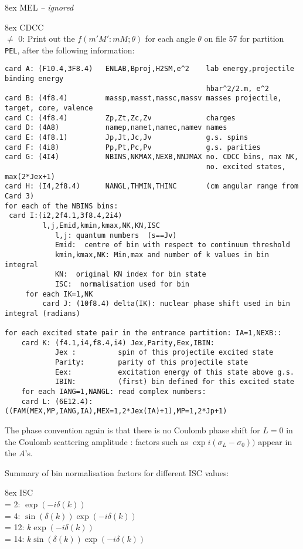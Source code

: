 \documentclass[11pt]{article}
\begin{document}
\hangindent 8ex  MEL   {\em -- ignored}

\hangindent 8ex  CDCC
\\  $\neq$ 0:
Print out the $f(m'M':mM; \theta)$ for each angle $\theta$
on file 57 for partition {\tt PEL}, after the following information:
{\small
\begin{verbatim}
card A: (F10.4,3F8.4)   ENLAB,Bproj,H2SM,e^2    lab energy,projectile binding energy
                                                hbar^2/2.m, e^2
card B: (4f8.4)         massp,masst,massc,massv masses projectile, target, core, valence
card C: (4f8.4)         Zp,Zt,Zc,Zv             charges
card D: (4A8)           namep,namet,namec,namev names
card E: (4f8.1)         Jp,Jt,Jc,Jv             g.s. spins
card F: (4i8)           Pp,Pt,Pc,Pv             g.s. parities
card G: (4I4)           NBINS,NKMAX,NEXB,NNJMAX no. CDCC bins, max NK,
                                                no. excited states, max(2*Jex+1)
card H: (I4,2f8.4)      NANGL,THMIN,THINC       (cm angular range from Card 3)
for each of the NBINS bins:
 card I:(i2,2f4.1,3f8.4,2i4)
         l,j,Emid,kmin,kmax,NK,KN,ISC
            l,j: quantum numbers  (s==Jv)
            Emid:  centre of bin with respect to continuum threshold
            kmin,kmax,NK: Min,max and number of k values in bin integral
            KN:  original KN index for bin state
            ISC:  normalisation used for bin
     for each IK=1,NK
         card J: (10f8.4) delta(IK): nuclear phase shift used in bin integral (radians)

for each excited state pair in the entrance partition: IA=1,NEXB::
    card K: (f4.1,i4,f8.4,i4) Jex,Parity,Eex,IBIN:
            Jex :          spin of this projectile excited state
            Parity:        parity of this projectile state
            Eex:           excitation energy of this state above g.s.
            IBIN:          (first) bin defined for this excited state
    for each IANG=1,NANGL: read complex numbers:
    card L: (6E12.4): ((FAM(MEX,MP,IANG,IA),MEX=1,2*Jex(IA)+1),MP=1,2*Jp+1)
\end{verbatim}
}
The phase convention again is that there is no Coulomb phase shift
for $L = 0$ in the Coulomb scattering amplitude : factors such as
$\exp i(\sigma_L-\sigma_0))$  appear in the $A$'s.


Summary of bin normalisation factors for different ISC values:

\hangindent 8ex
ISC
\\ = 2:  $\exp(-i\delta(k))$
\\ = 4:  $\sin(\delta(k))\exp(-i\delta(k))$
\\ = 12:  $k\exp(-i\delta(k))$
\\ = 14:  $k\sin(\delta(k))\exp(-i\delta(k))$
\end{document}
